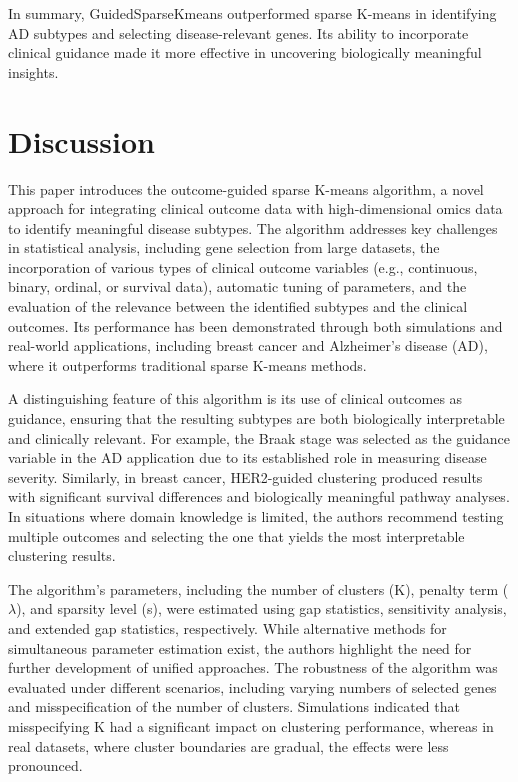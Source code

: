 \documentclass{statsoc}
\begin{document}
In summary, GuidedSparseKmeans outperformed sparse K-means in identifying AD subtypes and selecting disease-relevant genes. Its ability to incorporate clinical guidance made it more effective in uncovering biologically meaningful insights.

\section{Discussion}
This paper introduces the outcome-guided sparse K-means algorithm, a novel approach for integrating clinical outcome data with high-dimensional omics data to identify meaningful disease subtypes. The algorithm addresses key challenges in statistical analysis, including gene selection from large datasets, the incorporation of various types of clinical outcome variables (e.g., continuous, binary, ordinal, or survival data), automatic tuning of parameters, and the evaluation of the relevance between the identified subtypes and the clinical outcomes. Its performance has been demonstrated through both simulations and real-world applications, including breast cancer and Alzheimer’s disease (AD), where it outperforms traditional sparse K-means methods.

A distinguishing feature of this algorithm is its use of clinical outcomes as guidance, ensuring that the resulting subtypes are both biologically interpretable and clinically relevant. For example, the Braak stage was selected as the guidance variable in the AD application due to its established role in measuring disease severity. Similarly, in breast cancer, HER2-guided clustering produced results with significant survival differences and biologically meaningful pathway analyses. In situations where domain knowledge is limited, the authors recommend testing multiple outcomes and selecting the one that yields the most interpretable clustering results. 

The algorithm’s parameters, including the number of clusters (K), penalty term ($\lambda$), and sparsity level (s), were estimated using gap statistics, sensitivity analysis, and extended gap statistics, respectively. While alternative methods for simultaneous parameter estimation exist, the authors highlight the need for further development of unified approaches. The robustness of the algorithm was evaluated under different scenarios, including varying numbers of selected genes and misspecification of the number of clusters. Simulations indicated that misspecifying K had a significant impact on clustering performance, whereas in real datasets, where cluster boundaries are gradual, the effects were less pronounced.
\end{document}
